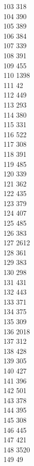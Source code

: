 { 103	318 \\
 104	390 \\
 105	389 \\
 106	384 \\
 107	339 \\
 108	391 \\
 109	455 \\
 110	1398 \\
 111	42 \\
 112	449 \\
 113	293 \\
 114	380 \\
 115	331 \\
 116	522 \\
 117	308 \\
 118	391 \\
 119	485 \\
 120	339 \\
 121	362 \\
 122	435 \\
 123	379 \\
 124	407 \\
 125	485 \\
 126	383 \\
 127	2612 \\
 128	361 \\
 129	383 \\
 130	298 \\
 131	431 \\
 132	443 \\
 133	371 \\
 134	375 \\
 135	309 \\
 136	2018 \\
 137	312 \\
 138	428 \\
 139	305 \\
 140	427 \\
 141	396 \\
 142	501 \\
 143	378 \\
 144	395 \\
 145	308 \\
 146	445 \\
 147	421 \\
 148	3520 \\
 149	49 \\
}
